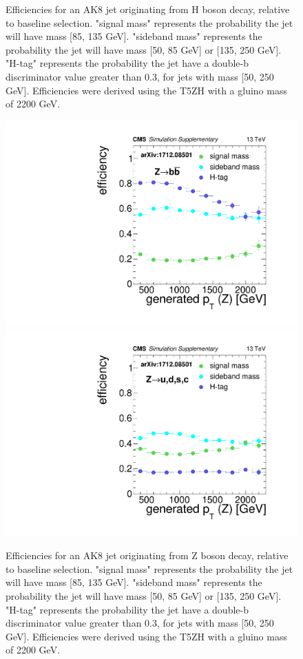 \begin{figure}[hbp!]
\caption[Efficiencies for an AK8 jet originating from H boson decay, relative to baseline selection.]{
Efficiencies for an AK8 jet originating from H boson decay, relative to baseline selection.
"signal mass" represents the probability the jet will have mass [85, 135 GeV].
"sideband mass" represents the probability the jet will have mass [50, 85 GeV] or [135, 250 GeV].
"H-tag" represents the probability the jet have a double-b discriminator value greater than 0.3, for jets with mass [50, 250 GeV].
Efficiencies were derived using the T5ZH  with a gluino mass of 2200 GeV.
}
\label{fig:effH}
\end{figure}

\begin{figure}[hbp!]
\centering
\includegraphics[width=0.425\linewidth]{figs/CMS-SUS-17-006_Figure-aux_011.pdf}
\includegraphics[width=0.425\linewidth]{figs/CMS-SUS-17-006_Figure-aux_012.pdf}
\caption[Efficiencies for an AK8 jet originating from Z boson decay, relative to baseline selection.]{
Efficiencies for an AK8 jet originating from Z boson decay, relative to baseline selection.
"signal mass" represents the probability the jet will have mass  [85, 135 GeV].
"sideband mass" represents the probability the jet will have mass [50, 85 GeV] or [135, 250 GeV].
"H-tag" represents the probability the jet have a double-b discriminator value greater than 0.3, for jets with mass [50, 250 GeV].
Efficiencies were derived using the T5ZH  with a gluino mass of 2200 GeV.
}
\label{fig:effZ}
\end{figure}

